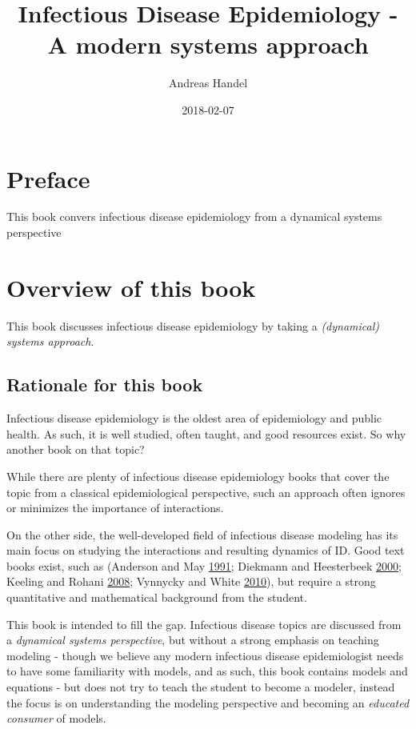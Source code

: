\documentclass[]{book}
\title{Infectious Disease Epidemiology - A modern systems approach}
\author{Andreas Handel}
\date{2018-02-07}
\theoremstyle{definition}
\theoremstyle{definition}
\theoremstyle{definition}
\theoremstyle{remark}
\begin{document}
\maketitle

{
\setcounter{tocdepth}{1}
\tableofcontents
}
\chapter*{Preface}\label{preface}

This book convers infectious disease epidemiology from a dynamical
systems perspective

\chapter{Overview of this book}\label{overview-of-this-book}

This book discusses infectious disease epidemiology by taking a
\emph{(dynamical) systems approach}.

\section{Rationale for this book}\label{rationale-for-this-book}

Infectious disease epidemiology is the oldest area of epidemiology and
public health. As such, it is well studied, often taught, and good
resources exist. So why another book on that topic?

While there are plenty of infectious disease epidemiology books that
cover the topic from a classical epidemiological perspective, such an
approach often ignores or minimizes the importance of interactions.

On the other side, the well-developed field of infectious disease
modeling has its main focus on studying the interactions and resulting
dynamics of ID. Good text books exist, such as (Anderson and May
\protect\hyperlink{ref-anderson91}{1991}; Diekmann and Heesterbeek
\protect\hyperlink{ref-diekmann00}{2000}; Keeling and Rohani
\protect\hyperlink{ref-keeling08}{2008}; Vynnycky and White
\protect\hyperlink{ref-vynnycky10}{2010}), but require a strong
quantitative and mathematical background from the student.

This book is intended to fill the gap. Infectious disease topics are
discussed from a \emph{dynamical systems perspective}, but without a
strong emphasis on teaching modeling - though we believe any modern
infectious disease epidemiologist needs to have some familiarity with
models, and as such, this book contains models and equations - but does
not try to teach the student to become a modeler, instead the focus is
on understanding the modeling perspective and becoming an \emph{educated
consumer} of models.
\end{document}
